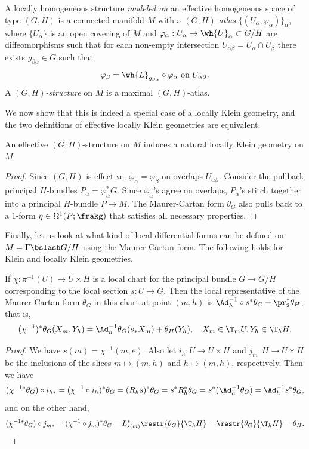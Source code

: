 \begin{defn}\label{def GH-structure}
    A locally homogeneous structure \emph{modeled on} an effective homogeneous space of type $(G,H)$ is a connected manifold $M$ with a \emph{$(G,H)$-atlas} $\{(U_\alpha,\varphi_\alpha)\}_\alpha$, where $\{U_\alpha\}$ is an open covering of $M$ and $\varphi_\alpha:U_\alpha\to \wh{U}_{\alpha}\subset G\slash H$ are diffeomorphisms such that for each non-empty intersection $U_{\alpha\beta}=U_\alpha\cap U_\beta$ there exists $g_{\beta\alpha}\in G$ such that 
    \[\varphi_{\beta}=\wh{L}_{g_{\beta\alpha}}\circ \varphi_\alpha\text{ on }U_{\alpha\beta}.\]
    A \emph{$(G,H)$-structure} on $M$ is a maximal $(G,H)$-atlas.
\end{defn}

We now show that this is indeed a special case of a locally Klein geometry, and the two definitions of effective locally Klein geometries are equivalent.

\begin{prop}
    An effective $(G,H)$-structure on $M$ induces a natural locally Klein geometry on $M$.
\end{prop}
\begin{proof}
    Since $(G,H)$ is effective, $\varphi_\alpha=\varphi_\beta$ on overlaps $U_{\alpha\beta}$. Consider the pullback principal $H$-bundles $P_\alpha=\varphi_\alpha^\ast G$. Since $\varphi_\alpha$'s agree on overlaps, $P_\alpha$'s stitch together into a principal $H$-bundle $P\to M$. The Maurer-Cartan form $\theta_G$ also pulls back to a $1$-form $\eta\in\Omega^1(P;\frakg)$ that satisfies all necessary properties.
\end{proof}


Finally, let us look at what kind of local differential forms can be defined on $M=\Gamma\bslash G\slash H$ using the Maurer-Cartan form. The following holds for Klein and locally Klein geometries.

\begin{prop}\label{prop 4.7.1 Sharpe}
    If $\chi:\pi^{-1}(U)\to U\times H$ is a local chart for the principal bundle $G\to G\slash H$ corresponding to the local section $ s:U\to G$. Then the local representative of the Maurer-Cartan form $\theta_G$ in this chart at point $(m,h)$ is $\Ad_h^{-1}\circ  s^\ast\theta_G +\pr_2^\ast\theta_H$, that is,
    \[(\chi^{-1})^\ast\theta_G(X_m,Y_h)=\Ad_h^{-1}\theta_G( s_\ast X_m)+\theta_H(Y_h),\quad X_m\in \T_mU,Y_h\in \T_h H.\]
\end{prop}
\begin{proof}
    We have $ s(m)=\chi^{-1}(m,e)$. Also let $i_h:U\to U\times H$ and $j_m:H\to U\times H$ be the inclusions of the slices $m\mapsto (m,h)$ and $h\mapsto (m,h)$, respectively. Then we have
    \[(\chi^{-1\ast}\theta_G)\circ i_{h\ast}=(\chi^{-1}\circ i_h)^\ast \theta_G=(R_h s)^\ast \theta_G= s^\ast R_h^\ast \theta_G= s^\ast(\Ad_h^{-1}\theta_G)=\Ad_h^{-1} s^\ast \theta_G,\]
    and on the other hand, 
    \[(\chi^{-1\ast}\theta_G)\circ j_{m\ast}=(\chi^{-1}\circ j_m)^\ast \theta_G=L_{ s(m)}^\ast\restr{\theta_G}{\T_hH}=\restr{\theta_G}{\T_hH}=\theta_H.\]
\end{proof}

